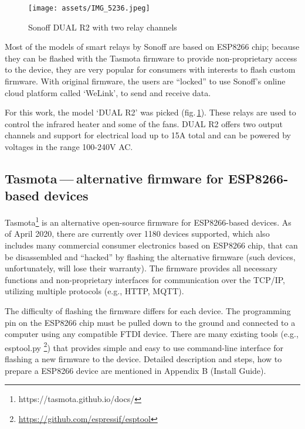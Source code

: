 \begin{figure}[h]{}
    \centering\texttt{[image: assets/IMG\_5236.jpeg]}
    \caption{Sonoff DUAL R2 with two relay channels}
    \label{dualr2}
\end{figure}

\pagebreak

Most of the models of smart relays by Sonoff are based on ESP8266 chip;
because they can be flashed with the Tasmota firmware to provide non-proprietary
access to the device, they are very popular for consumers with interests to
flash custom firmware. With original firmware, the users are ``locked'' to use
Sonoff’s online cloud platform called `WeLink', to send and receive data.

For this work, the model `DUAL R2' was picked (fig.\,\ref{dualr2}). 
These relays are used to
control the infrared heater and some of the fans. DUAL R2 offers two output
channels and support for electrical load up to 15A total and can be powered
by voltages in the range 100-240V AC.

\hypertarget{x-tasmota — alternative-firmware-for-esp8266-based-devices}{\subsection{Tasmota — alternative firmware for ESP8266-based devices}}
Tasmota\footnote{https://tasmota.github.io/docs/} is an alternative open-source 
firmware for ESP8266-based devices.
As of April 2020, there are currently over 1180 devices supported\cite{tasdirec},
which also includes many commercial consumer electronics based on ESP8266 chip,
that can be disassembled and ``hacked'' by flashing the alternative firmware
(such devices, unfortunately, will lose their warranty).
The firmware provides all necessary functions and non-proprietary
interfaces for communication over the TCP/IP, utilizing multiple protocols
(e.g., HTTP, MQTT).


The difficulty of flashing the firmware differs for each device. The programming pin
on the ESP8266 chip must be pulled down to the ground and connected to a computer using
any compatible FTDI device. There are many existing tools (e.g., esptool.py
\footnote{\href{https://github.com/espressif/esptool}{https://github.com/espressif/esptool}})
that provides simple and easy to use command-line
interface for flashing a new firmware to the device. Detailed description and
steps, how to prepare a ESP8266 device are mentioned in Appendix B (Install Guide).

